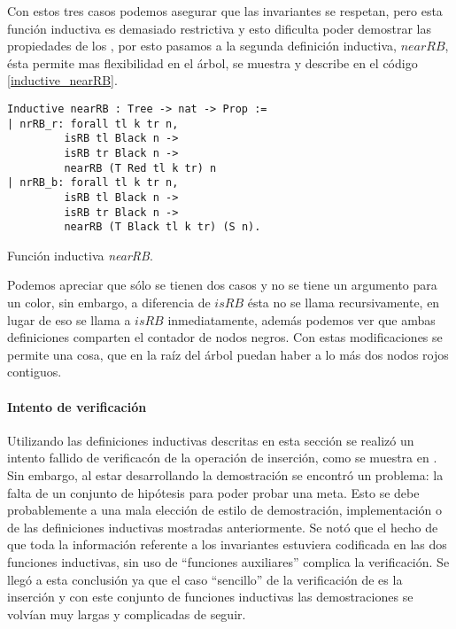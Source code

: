 Con estos tres casos podemos asegurar que las invariantes se respetan, pero esta funci\'on
inductiva es demasiado restrictiva y esto dificulta poder demostrar las propiedades de los {\arns},
por esto pasamos a la segunda definici\'on inductiva, \hyperref[inductive_nearRB]{$nearRB$}, \'esta 
permite mas flexibilidad en el \'arbol, se muestra y describe en el c\'odigo \ref{inductive_nearRB}.
\begin{listing}[!ht]
\centering
\captionsetup{justification=centering}
\begin{verbatim}
Inductive nearRB : Tree -> nat -> Prop :=
| nrRB_r: forall tl k tr n,
         isRB tl Black n ->
         isRB tr Black n ->
         nearRB (T Red tl k tr) n
| nrRB_b: forall tl k tr n,
         isRB tl Black n ->
         isRB tr Black n ->
         nearRB (T Black tl k tr) (S n).
\end{verbatim}
\caption{Funci\'on inductiva \emph{nearRB}.}
\label{inductive_nearRB}
\end{listing}

Podemos apreciar que s\'olo se tienen dos casos y no se tiene un argumento para un color, sin
embargo, a diferencia de \hyperref[inductive_isRB]{$isRB$} \'esta no se llama recursivamente, en lugar
de eso se llama a \hyperref[inductive_isRB]{$isRB$} inmediatamente, además podemos ver que ambas 
definiciones comparten el contador de nodos negros. Con estas modificaciones se permite una cosa, 
que en la ra\'iz del \'arbol puedan haber a lo m\'as dos nodos rojos contiguos.

\paragraph{Intento de verificaci\'on}
Utilizando las definiciones inductivas descritas en esta secci\'on se realiz\'o un intento fallido 
de verificac\'on de la operaci\'on de inserci\'on, como se muestra en \cite{appel}. Sin embargo, al
estar desarrollando la demostraci\'on se encontró un problema: la falta de un conjunto de
hipótesis para poder probar una meta. Esto se debe probablemente a una mala elección de estilo de
demostraci\'on, implementaci\'on o de las definiciones inductivas mostradas anteriormente. Se not\'o
que el hecho de que toda la informaci\'on referente a los invariantes estuviera codificada en las
dos funciones inductivas, sin uso de ``funciones auxiliares'' complica la verificaci\'on. Se
lleg\'o a esta conclusi\'on ya que el caso ``sencillo'' de la verificaci\'on de {\arns} es la 
inserci\'on y con este conjunto de funciones inductivas las demostraciones se volvían muy largas y
complicadas de seguir.

